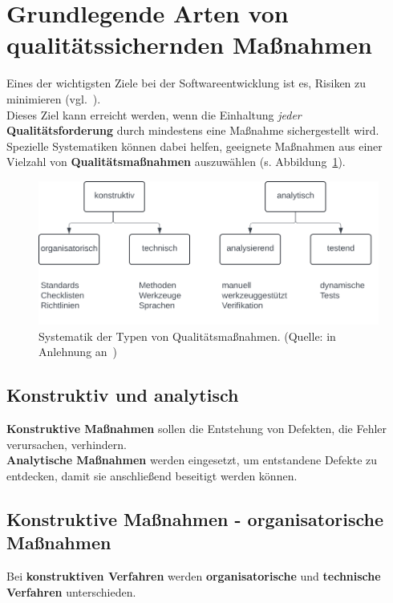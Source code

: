 \section{Grundlegende Arten von qualitätssichernden Maßnahmen}

Eines der wichtigsten Ziele bei der Softwareentwicklung ist es, Risiken zu minimieren (vgl.~\cite[7]{Wed09c}).\\
Dieses Ziel kann erreicht werden, wenn die Einhaltung \textit{jeder} \textbf{Qualitätsforderung} durch mindestens eine Maßnahme sichergestellt wird.\\

\noindent
Spezielle Systematiken können dabei helfen, geeignete Maßnahmen aus einer Vielzahl von \textbf{Qualitätsmaßnahmen}  auszuwählen (s. Abbildung~\ref{fig:systematik qualitätsmaßnahmen}).

\begin{figure}
    \centering
    \includegraphics[scale=0.4]{part four/Typen von Qualitätsmaßnahmen/img/systematik qualitätsmaßnahmen}
    \caption{Systematik der Typen von Qualitätsmaßnahmen. (Quelle: in Anlehnung an~\cite[Abb. 2.1, 8]{Wed09c})}
    \label{fig:systematik qualitätsmaßnahmen}
\end{figure}

\subsection*{Konstruktiv und analytisch}
\textbf{Konstruktive Maßnahmen} sollen die Entstehung von Defekten, die Fehler verursachen, verhindern.\\
\textbf{Analytische Maßnahmen} werden eingesetzt, um entstandene Defekte zu entdecken, damit sie anschließend beseitigt werden können.

\subsection*{Konstruktive Maßnahmen - organisatorische Maßnahmen}
Bei \textbf{konstruktiven Verfahren} werden \textbf{organisatorische} und \textbf{technische Verfahren} unterschieden.

